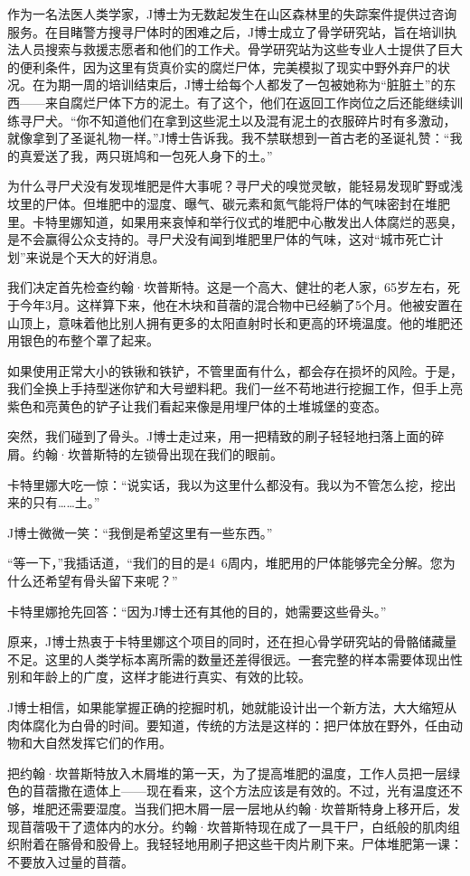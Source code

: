 \documentclass[12pt,oneside]{book}
\begin{document}
作为一名法医人类学家，J博士为无数起发生在山区森林里的失踪案件提供过咨询服务。在目睹警方搜寻尸体时的困难之后，J博士成立了骨学研究站，旨在培训执法人员搜索与救援志愿者和他们的工作犬。骨学研究站为这些专业人士提供了巨大的便利条件，因为这里有货真价实的腐烂尸体，完美模拟了现实中野外弃尸的状况。在为期一周的培训结束后，J博士给每个人都发了一包被她称为“脏脏土”的东西——来自腐烂尸体下方的泥土。有了这个，他们在返回工作岗位之后还能继续训练寻尸犬。“你不知道他们在拿到这些泥土以及混有泥土的衣服碎片时有多激动，就像拿到了圣诞礼物一样。”J博士告诉我。我不禁联想到一首古老的圣诞礼赞：“我的真爱送了我，两只斑鸠和一包死人身下的土。”

为什么寻尸犬没有发现堆肥是件大事呢？寻尸犬的嗅觉灵敏，能轻易发现旷野或浅坟里的尸体。但堆肥中的湿度、曝气、碳元素和氮气能将尸体的气味密封在堆肥里。卡特里娜知道，如果用来哀悼和举行仪式的堆肥中心散发出人体腐烂的恶臭，是不会赢得公众支持的。寻尸犬没有闻到堆肥里尸体的气味，这对“城市死亡计划”来说是个天大的好消息。

我们决定首先检查约翰·坎普斯特。这是一个高大、健壮的老人家，65岁左右，死于今年3月。这样算下来，他在木块和苜蓿的混合物中已经躺了5个月。他被安置在山顶上，意味着他比别人拥有更多的太阳直射时长和更高的环境温度。他的堆肥还用银色的布整个罩了起来。

如果使用正常大小的铁锹和铁铲，不管里面有什么，都会存在损坏的风险。于是，我们全换上手持型迷你铲和大号塑料耙。我们一丝不苟地进行挖掘工作，但手上亮紫色和亮黄色的铲子让我们看起来像是用埋尸体的土堆城堡的变态。

突然，我们碰到了骨头。J博士走过来，用一把精致的刷子轻轻地扫落上面的碎屑。约翰·坎普斯特的左锁骨出现在我们的眼前。

卡特里娜大吃一惊：“说实话，我以为这里什么都没有。我以为不管怎么挖，挖出来的只有……土。”

J博士微微一笑：“我倒是希望这里有一些东西。”

“等一下，”我插话道，“我们的目的是4~6周内，堆肥用的尸体能够完全分解。您为什么还希望有骨头留下来呢？”

卡特里娜抢先回答：“因为J博士还有其他的目的，她需要这些骨头。”

原来，J博士热衷于卡特里娜这个项目的同时，还在担心骨学研究站的骨骼储藏量不足。这里的人类学标本离所需的数量还差得很远。一套完整的样本需要体现出性别和年龄上的广度，这样才能进行真实、有效的比较。

J博士相信，如果能掌握正确的挖掘时机，她就能设计出一个新方法，大大缩短从肉体腐化为白骨的时间。要知道，传统的方法是这样的：把尸体放在野外，任由动物和大自然发挥它们的作用。

把约翰·坎普斯特放入木屑堆的第一天，为了提高堆肥的温度，工作人员把一层绿色的苜蓿撒在遗体上——现在看来，这个方法应该是有效的。不过，光有温度还不够，堆肥还需要湿度。当我们把木屑一层一层地从约翰·坎普斯特身上移开后，发现苜蓿吸干了遗体内的水分。约翰·坎普斯特现在成了一具干尸，白纸般的肌肉组织附着在髂骨和股骨上。我轻轻地用刷子把这些干肉片刷下来。尸体堆肥第一课：不要放入过量的苜蓿。
\end{document}
